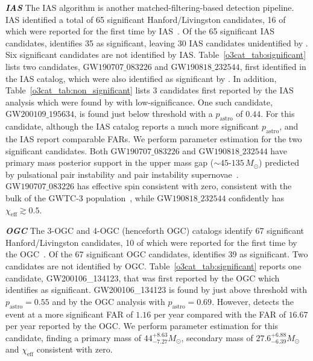 \begin{refsection}
\textbf{\emph{IAS}} The IAS algorithm is another matched-filtering-based detection pipeline. 
IAS identified a total of 65 significant Hanford/Livingston candidates, 16 of which were reported for the first time by IAS~\cite{ias_o3a, ias_o3b}. 
Of the 65 significant IAS candidates, \aframe identifies 35 as significant, leaving 30 IAS candidates unidentified by \aframe. 
Six \aframe significant candidates are not identified by IAS. 
Table~\ref{o3cat_tab:significant} lists two candidates, $\mathrm{GW}190707\_083226$ and $\mathrm{GW}190818\_232544$, first identified in the IAS catalog, which were also identified as significant by \aframe. 
In addition, Table~\ref{o3cat_tab:non_significant} lists 3 candidates first reported by the IAS analysis which were found by \aframe with low-significance. 
One such candidate, $\mathrm{GW}200109\_195634$, is found just below threshold with a $p_\mathrm{astro}$ of $0.44$. 
For this candidate, although the IAS catalog reports a much more significant $p_\mathrm{astro}$, \aframe and the IAS report comparable FARs. 
We perform parameter estimation for the two significant candidates. 
Both $\mathrm{GW}190707\_083226$ and $\mathrm{GW}190818\_232544$ have primary mass posterior support in the upper mass gap ($\sim 45$-$135\,M_\odot$) predicted by pulsational pair instability and pair instability supernovae~\cite{Woosley_2021}.
$\mathrm{GW}190707\_083226$ has effective spin consistent with zero, consistent with the bulk of the GWTC-3 population~\cite{gwtc-3-astro}, while $\mathrm{GW}190818\_232544$ confidently has $\chi_{\mathrm{eff}} \gtrsim 0.5$. 

\textbf{\emph{OGC}} The 3-OGC and 4-OGC (henceforth OGC) catalogs identify 67 significant Hanford/Livingston candidates, 10 of which were reported for the first time by the OGC~\cite{3-ogc, 4-ogc}. 
Of the 67 significant OGC candidates, \aframe identifies 39 as significant. 
Two \aframe candidates are not identified by OGC. 
Table~\ref{o3cat_tab:significant} reports one candidate, GW200106\_134123, that was first reported by the OGC which \aframe identifies as significant. 
GW200106\_134123 is found by \aframe just above threshold with $p_\mathrm{astro} = 0.55$ and by the OGC analysis with $p_\mathrm{astro} = 0.69$. 
However, \aframe detects the event at a more significant FAR of $1.16$ per year compared with the FAR of $16.67$ per year reported by the OGC. 
We perform parameter estimation for this candidate, finding a primary mass of $44^{+8.63}_{-7.27} M_{\odot}$, secondary mass of $27.6^{+6.88}_{-6.39} M_{\odot}$ and $\chi_{\mathrm{eff}}$ consistent with zero.


\end{refsection}
